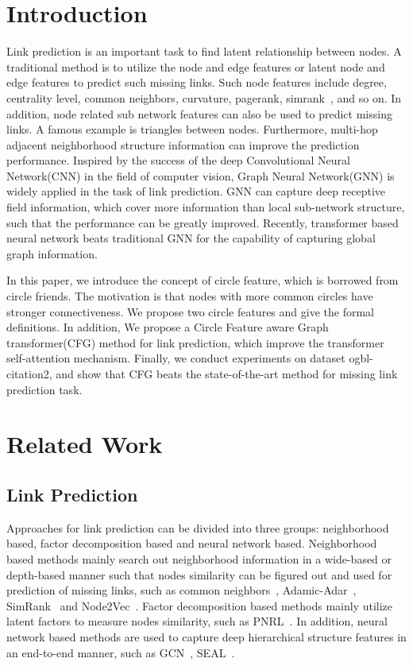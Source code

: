 \documentclass[sigconf]{acmart}
\begin{document}
\section{Introduction}
Link prediction is an important task to find latent relationship between nodes. A traditional method is to utilize the node and edge features or latent node and edge features to predict such missing links. Such node features include degree, centrality level, common neighbors\cite{liben2007link}, curvature\cite{federer1959curvature}, pagerank\cite{page1998pagerank}, simrank~\cite{jeh2002simrank}, and so on. In addition, node related sub network features can also be used to predict missing links. A famous example is triangles between nodes. Furthermore, multi-hop adjacent neighborhood structure information can improve the prediction performance. Inspired by the success of the deep Convolutional Neural Network(CNN)\cite{li2021survey} in the field of computer vision, Graph Neural Network(GNN) \cite{wu2020comprehensive} is widely applied in the task of link prediction. GNN can capture deep receptive field information, which cover more information than local sub-network structure, such that the performance can be greatly improved. Recently, transformer based neural network beats traditional GNN for the capability of capturing global graph information. 

In this paper, we introduce the concept of circle feature, which is borrowed from circle friends. The motivation is that nodes with more common circles have stronger connectiveness. We propose two circle features and give the formal definitions. In addition, We propose a Circle Feature aware Graph transformer(CFG) method for link prediction, which improve the transformer self-attention mechanism. Finally, we conduct experiments on dataset ogbl-citation2, and show that CFG beats the state-of-the-art method for missing link prediction task.


\section{Related Work}
\label{sec:relatedwork}
\subsection{Link Prediction} Approaches for link prediction can be divided into three groups: neighborhood based, factor decomposition based and neural network based. Neighborhood based methods mainly search out neighborhood information in a wide-based or depth-based manner such that nodes similarity can be figured out and used for prediction of missing links, such as common neighbors~\cite{liben2007link},  Adamic-Adar~\cite{adamic2003friends}, SimRank~\cite{jeh2002simrank} and Node2Vec~\cite{grover2016node2vec}. Factor decomposition based methods mainly utilize latent factors to measure nodes similarity, such as PNRL~\cite{wang2017predictive}. In addition,  neural network based methods are used to capture deep hierarchical structure features in an end-to-end manner, such as GCN~\cite{kipf2016semi}, SEAL~\cite{zhang2018link}. 
\end{document}
